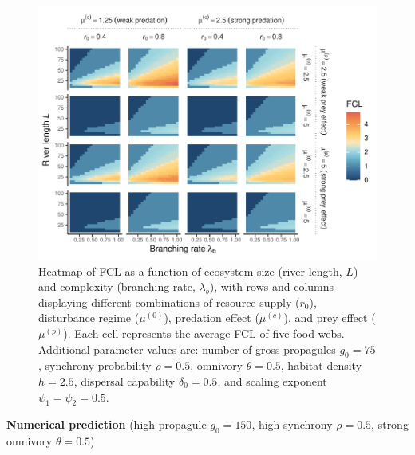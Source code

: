 \begin{figure}
\centering
\includegraphics{../data_fmt/fig_rho05_g75_theta05.pdf}
\caption{Heatmap of FCL as a function of ecosystem size (river length,
\(L\)) and complexity (branching rate, \(\lambda_b\)), with rows and
columns displaying different combinations of resource supply (\(r_0\)),
disturbance regime (\(\mu^{(0)}\)), predation effect (\(\mu^{(c)}\)),
and prey effect (\(\mu^{(p)}\)). Each cell represents the average FCL of
five food webs. Additional parameter values are: number of gross
propagules \(g_0=75\), synchrony probability \(\rho=0.5\), omnivory
\(\theta=0.5\), habitat density \(h=2.5\), dispersal capability
\(\delta_0=0.5\), and scaling exponent \(\psi_1=\psi_2=0.5\).}
\end{figure}

\newpage

\textbf{Numerical prediction} (high propagule \(g_0 = 150\), high
synchrony \(\rho = 0.5\), strong omnivory \(\theta = 0.5\))

